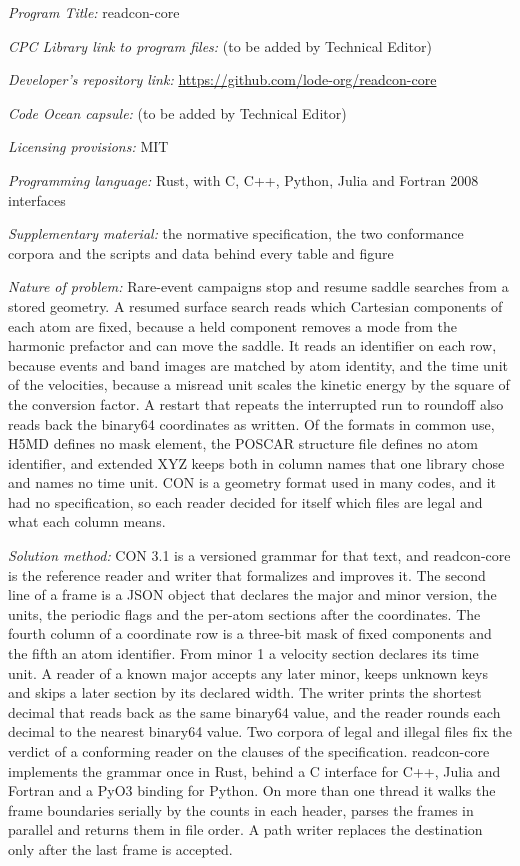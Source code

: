 \documentclass[preprint,12pt]{elsarticle}
\begin{document}
\begin{small} \noindent\textit{Program Title:} readcon-core

\noindent\textit{CPC Library link to program files:} (to be added by
Technical Editor)

\noindent\textit{Developer's repository link:}
\url{https://github.com/lode-org/readcon-core}

\noindent\textit{Code Ocean capsule:} (to be added by Technical Editor)

\noindent\textit{Licensing provisions:} MIT

\noindent\textit{Programming language:} Rust, with C, C++, Python, Julia
and Fortran 2008 interfaces

\noindent\textit{Supplementary material:} the normative specification,
the two conformance corpora and the scripts and data behind every table
and figure

\textit{Nature of problem:} Rare-event campaigns stop and resume saddle
searches from a stored geometry.
A resumed surface search reads which Cartesian components of each atom
are fixed, because a held component removes a mode from the harmonic
prefactor and can move the saddle.
It reads an identifier on each row, because events and band images are
matched by atom identity, and the time unit of the velocities, because a
misread unit scales the kinetic energy by the square of the conversion
factor.
A restart that repeats the interrupted run to roundoff also reads back
the binary64 coordinates as written.
Of the formats in common use, H5MD defines no mask element, the POSCAR
structure file defines no atom identifier, and extended XYZ keeps both
in column names that one library chose and names no time unit.
CON is a geometry format used in many codes, and it had no
specification, so each reader decided for itself which files are legal
and what each column means.

\textit{Solution method:} CON 3.1 is a versioned grammar for that text,
and readcon-core is the reference reader and writer that formalizes and
improves it.
The second line of a frame is a JSON object that declares the major and
minor version, the units, the periodic flags and the per-atom sections
after the coordinates.
The fourth column of a coordinate row is a three-bit mask of fixed
components and the fifth an atom identifier.
From minor 1 a velocity section declares its time unit.
A reader of a known major accepts any later minor, keeps unknown keys
and skips a later section by its declared width.
The writer prints the shortest decimal that reads back as the same
binary64 value, and the reader rounds each decimal to the nearest
binary64 value.
Two corpora of legal and illegal files fix the verdict of a conforming
reader on the clauses of the specification.
readcon-core implements the grammar once in Rust, behind a C interface
for C++, Julia and Fortran and a PyO3 binding for Python.
On more than one thread it walks the frame boundaries serially by the
counts in each header, parses the frames in parallel and returns them in
file order.
A path writer replaces the destination only after the last frame is
accepted.


\end{small}
\end{document}
